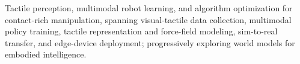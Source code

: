 
{\CVInterestFamily\fontsize{10pt}{11pt}\selectfont
Tactile perception, multimodal robot learning, and algorithm optimization for contact-rich manipulation, spanning visual-tactile data collection, multimodal policy training, tactile representation and force-field modeling, sim-to-real transfer, and edge-device deployment; progressively exploring world models for embodied intelligence.\par}
